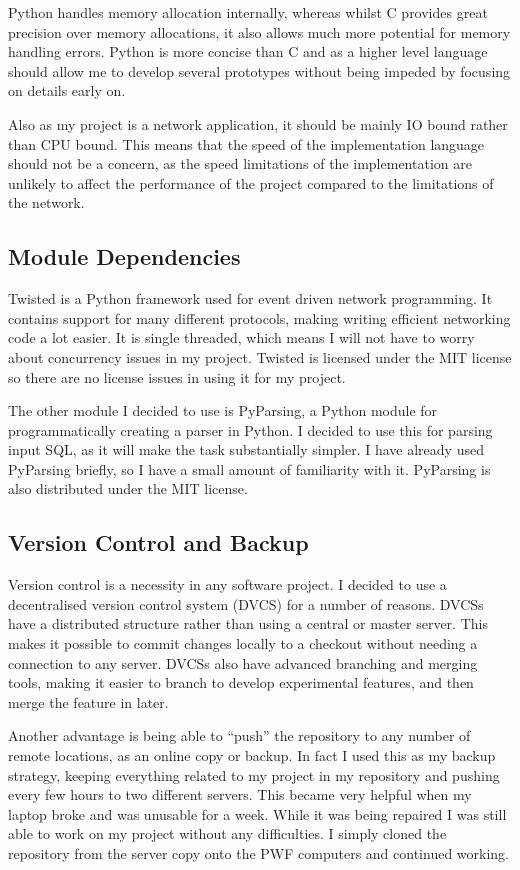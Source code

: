 \documentclass[12pt,twoside,notitlepage]{report}
\begin{document}
Python handles memory allocation internally, whereas whilst C provides great precision over memory
allocations, it also allows much more potential for memory handling errors. Python is more concise
than C and as a higher level language should allow me to develop several prototypes without being
impeded by focusing on details early on.

Also as my project is a network application, it should be mainly IO bound rather than CPU bound.
This means that the speed of the implementation language should not be a concern, as the speed
limitations of the implementation are unlikely to affect the performance of the project compared
to the limitations of the network.

\subsection{Module Dependencies}

Twisted is a Python framework used for event driven network programming. It contains support for
many different protocols, making writing efficient networking code a lot easier.  It is single
threaded, which means I will not have to worry about concurrency issues in my project. Twisted is
licensed under the MIT license so there are no license issues in using it for my project.

The other module I decided to use is PyParsing, a Python module for programmatically creating a
parser in Python. I decided to use this for parsing input SQL, as it will make the task
substantially simpler. I have already used PyParsing briefly, so I have a small amount of
familiarity with it. PyParsing is also distributed under the MIT license.

\subsection{Version Control and Backup}

Version control is a necessity in any software project. I decided to use a decentralised version
control system (DVCS) for a number of reasons. DVCSs have a distributed structure rather than
using a central or master server. This makes it possible to commit changes locally to a checkout
without needing a connection to any server. DVCSs also have advanced branching and merging tools,
making it easier to branch to develop experimental features, and then merge the feature in later.

Another advantage is being able to ``push'' the repository to any number of remote locations, as
an online copy or backup. In fact I used this as my backup strategy, keeping everything related to
my project in my repository and pushing every few hours to two different servers. This became very
helpful when my laptop broke and was unusable for a week. While it was being repaired I was still
able to work on my project without any difficulties. I simply cloned the repository from the
server copy onto the PWF computers and continued working.
\end{document}
